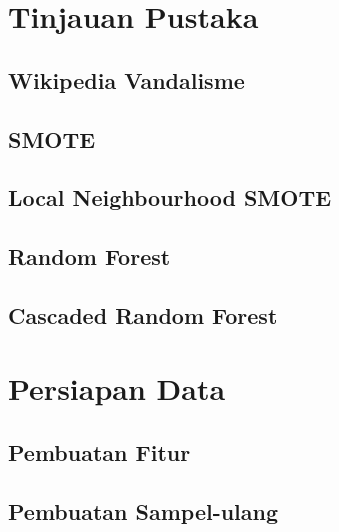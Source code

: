 





\newpage
{}


\newpage
{}


\chapter{Tinjauan Pustaka}
\section{Wikipedia Vandalisme}
\section{SMOTE}
\section{Local Neighbourhood SMOTE}
\section{Random Forest}
\section{Cascaded Random Forest}

\chapter{Persiapan Data}
\section{Pembuatan Fitur}
\section{Pembuatan Sampel-ulang}





\clearpage
{}
\printbibliography


